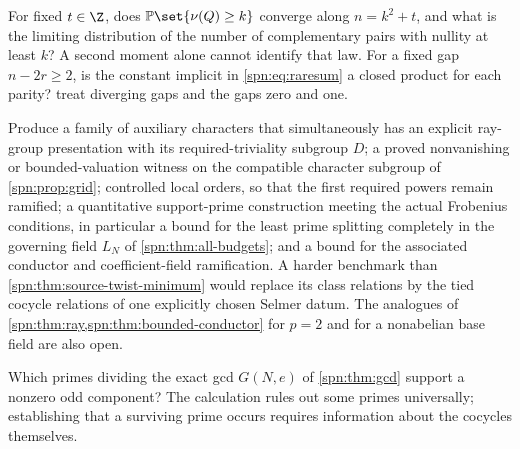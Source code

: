 \begin{question}\label{spn:q:binary}
For fixed $t\in\Z$, does $\spnP\set{\nu(Q)\ge k}$ converge along $n=k^2+t$,
and what is the limiting distribution of the number of complementary pairs
with nullity at least $k$? A second moment alone cannot identify that law.
For a fixed gap $n-2r\ge2$, is the constant implicit in
\eqref{spn:eq:raresum} a closed product for each parity?
 treat diverging gaps and the gaps
zero and one.
\end{question}

\begin{question}\label{spn:q:twists}
Produce a family of auxiliary characters that simultaneously has an explicit
ray-group presentation with its required-triviality subgroup $D$; a proved
nonvanishing or bounded-valuation witness on the compatible character
subgroup of \cref{spn:prop:grid}; controlled local orders, so that the first
required powers remain ramified; a quantitative support-prime construction
meeting the actual Frobenius conditions, in particular a bound for the least
prime splitting completely in the governing field $L_N$ of
\cref{spn:thm:all-budgets}; and a bound for the associated conductor and
coefficient-field ramification. A harder benchmark than
\cref{spn:thm:source-twist-minimum} would replace its class relations by the
tied cocycle relations of one explicitly chosen Selmer datum. The analogues
of \cref{spn:thm:ray,spn:thm:bounded-conductor} for $p=2$ and for a
nonabelian base field are also open.
\end{question}

\begin{question}\label{spn:q:primes}
Which primes dividing the exact gcd $G(N,e)$ of \cref{spn:thm:gcd} support a
nonzero odd component? The calculation rules out some primes universally;
establishing that a surviving prime occurs requires information about the
cocycles themselves.
\end{question}
